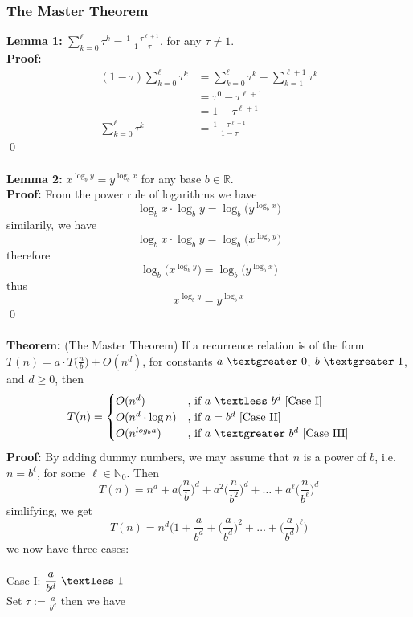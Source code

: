 \documentclass{article}
\newcommand{\tb}[1]{\textbf{#1}}
\newcommand{\N}{\mathbb{N}}
\newcommand{\R}{\mathbb{R}}
\newcommand{\lt}{\textless}
\newcommand{\gt}{\textgreater}
\newcommand{\x}{\cdot}
\newcommand{\thm}{\textbf{Theorem: }}
\newcommand{\proo}{\textbf{Proof: }}
\begin{document}
\subsubsection{The Master Theorem}
\tb{Lemma 1:} $\displaystyle \sum_{k=0}^{\ell} \tau^k = \frac{1-\tau^{\ell + 1}}{1-\tau}$, for any $\tau \neq 1$.\\
\proo
\begin{align*}
	(1-\tau)\sum_{k=0}^{\ell} \tau^k &= \sum_{k=0}^{\ell} \tau^k - \sum_{k=1}^{\ell+1} \tau^k\\
		&= \tau^0 - \tau^{\ell + 1}\\
		&= 1 - \tau^{\ell + 1}\\
	\sum_{k=0}^{\ell} \tau^k &= \frac{1 - \tau^{\ell + 1}}{1- \tau}
\end{align*}
\qed\\\\
\tb{Lemma 2:} $\displaystyle x^{\log_{b}y} = y^{\log_{b}x}$ for any base $b \in \R$.\\
\proo From the power rule of logarithms we have
\[\log_{b}x \x \log_{b}y = \log_{b}\big(y^{\log_{b}x}\big)\]
similarily, we have
\[\log_{b}x \x \log_{b}y = \log_{b}\big(x^{\log_{b}y}\big)\]
therefore
\[\log_{b}\big(x^{\log_{b}y}\big) = \log_{b}\big(y^{\log_{b}x}\big)\]
thus
\[x^{\log_{b}y} = y^{\log_{b}x}\]
\qed\\\\
\thm (The Master Theorem) If a recurrence relation is of the form $\displaystyle T(n) = a\x T\Big(\frac{n}{b}\Big) + O(n^d)$, for constants $a\ \gt\ 0$, $b\ \gt\ 1$, and $d \geq 0$, then
\[
T(n) =
\begin{cases}
	O(n^d) &\text{, if } a\ \lt\ b^d \text{ [Case I]}\\
	O(n^d\x \log n) &\text{, if } a = b^d \text{ [Case II]}\\
	O(n^{log_{b}a}) &\text{, if } a\ \gt\ b^d \text{ [Case III]}
\end{cases}
\]
\proo By adding dummy numbers, we may assume that $n$ is a power of $b$, i.e. $n = b^{\ell}$, for some $\ell \in \N_{0}$. Then
\[T(n) = n^d + a\Big(\frac{n}{b}\Big)^d + a^{2}\Big(\frac{n}{b^2}\Big)^d + \dots + a^{\ell}\Big(\frac{n}{b^{\ell}}\Big)^d\]
simlifying, we get
\[T(n) = n^d \bigg(1 + \frac{a}{b^d} + \Big(\frac{a}{b^d}\Big)^2 + \dots + \Big(\frac{a}{b^d}\Big)^{\ell}\bigg)\]
we now have three cases:\\\\
Case I: $\displaystyle \frac{a}{b^d}\ \lt\ 1$\\
Set $\displaystyle \tau := \frac{a}{b^d}$ then we have
\end{document}

